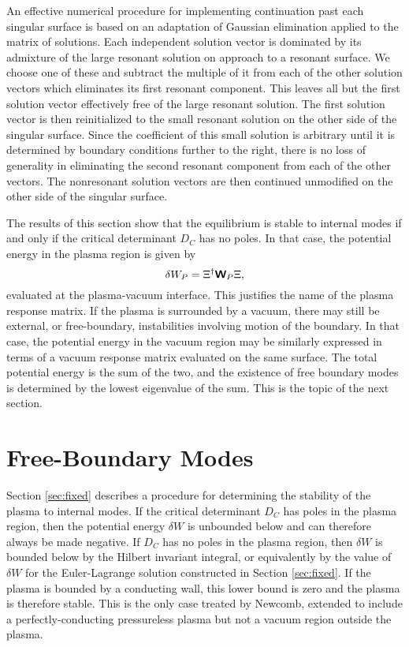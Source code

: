 \documentclass[prb,twocolumn,showpacs,preprintnumbers,amsmath,amssymb]{revtex4}
\renewcommand*{\t}[1]{\hbox{\sffamily\bfseries #1}}
\begin{document}
An effective numerical procedure for implementing continuation past each
singular surface is based on an adaptation of Gaussian elimination
applied to the matrix of solutions.  Each independent solution vector is
dominated by its admixture of the large resonant solution on approach to
a resonant surface.  We choose one of these and subtract the multiple of
it from each of the other solution vectors which eliminates its first
resonant component.  This leaves all but the first solution vector
effectively free of the large resonant solution.  The first solution
vector is then reinitialized to the small resonant solution on the other
side of the singular surface.  Since the coefficient of this small
solution is arbitrary until it is determined by boundary conditions
further to the right, there is no loss of generality in eliminating the
second resonant component from each of the other vectors.  The
nonresonant solution vectors are then continued unmodified on the other
side of the singular surface.

The results of this section show that the equilibrium is stable to
internal modes if and only if the critical determinant $D_C$ has no
poles.  In that case, the potential energy in the plasma region is given
by
\begin{equation}
\delta W_P = \Xi^\dagger \t{W}_P \Xi,
\label{eq:plasma_energy}
\end{equation}
evaluated at the plasma-vacuum interface.  This justifies the name of
the plasma response matrix.  If the plasma is surrounded by a vacuum,
there may still be external, or free-boundary, instabilities involving
motion of the boundary.  In that case, the potential energy in the
vacuum region may be similarly expressed in terms of a vacuum response
matrix evaluated on the same surface.  The total potential energy is the
sum of the two, and the existence of free boundary modes is determined
by the lowest eigenvalue of the sum.  This is the topic of the next
section.

\section{\label{sec:free}Free-Boundary Modes}

Section \ref{sec:fixed} describes a procedure for determining the
stability of the plasma to internal modes.  If the critical determinant
$D_C$ has poles in the plasma region, then the potential energy $\delta
W$ is unbounded below and can therefore always be made negative.  If
$D_C$ has no poles in the plasma region, then $\delta W$ is bounded
below by the Hilbert invariant integral, or equivalently by the value of
$\delta W$ for the Euler-Lagrange solution constructed in Section
\ref{sec:fixed}.  If the plasma is bounded by a conducting wall, this
lower bound is zero and the plasma is therefore stable.  This is the
only case treated by Newcomb, extended to include a perfectly-conducting
pressureless plasma but not a vacuum region outside the plasma.
\end{document}
